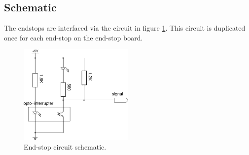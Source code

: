 			
		\subsection{Schematic}
			
			\label{sec:endstopDiagram}
			
			The endstops are interfaced via the circuit in figure
			\ref{fig:endstopschem}. This circuit is duplicated once for each end-stop
			on the end-stop board.
			
			\begin{figure}[p]
				\center
				\includegraphics[width=0.5\textwidth]{circuits/endstop.pdf}
				\caption{End-stop circuit schematic.}
				\label{fig:endstopschem}
			\end{figure}

